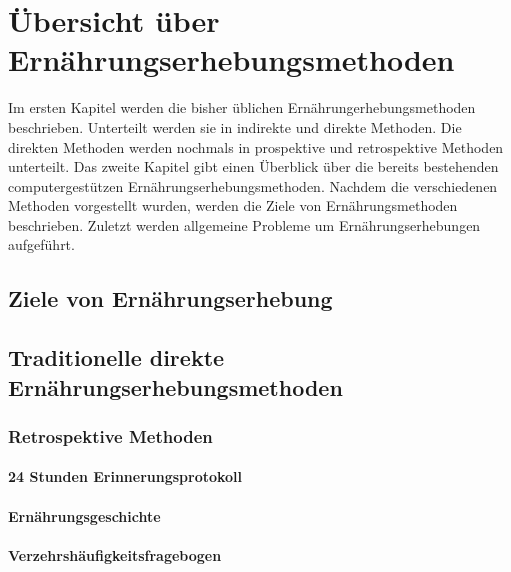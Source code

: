 




\section{Übersicht über Ernährungserhebungsmethoden}

Im ersten Kapitel werden die bisher üblichen Ernährungerhebungsmethoden beschrieben. Unterteilt werden sie in indirekte und direkte Methoden. Die direkten Methoden werden nochmals in prospektive und retrospektive Methoden unterteilt. Das zweite Kapitel gibt einen Überblick über die bereits bestehenden computergestützen Ernährungserhebungsmethoden. Nachdem die verschiedenen Methoden vorgestellt wurden, werden die Ziele von Ernährungsmethoden beschrieben. Zuletzt werden allgemeine Probleme um Ernährungserhebungen aufgeführt. 

\subsection{Ziele von Ernährungserhebung}
\subsection{Traditionelle direkte Ernährungserhebungsmethoden}

\subsubsection{Retrospektive Methoden}

\paragraph{24 Stunden Erinnerungsprotokoll}


\paragraph{Ernährungsgeschichte}


\paragraph{Verzehrshäufigkeitsfragebogen}


